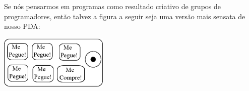 Se nós pensarmos em programas como resultado criativo de grupos de programadores,
então talvez a figura a seguir seja uma versão mais sensata de nosso PDA:

\beforefig
\centerline{\includegraphics[height=1.00in]{figs2/pda2.eps}}
\afterfig

%
%
%
%
%
%
%
%
